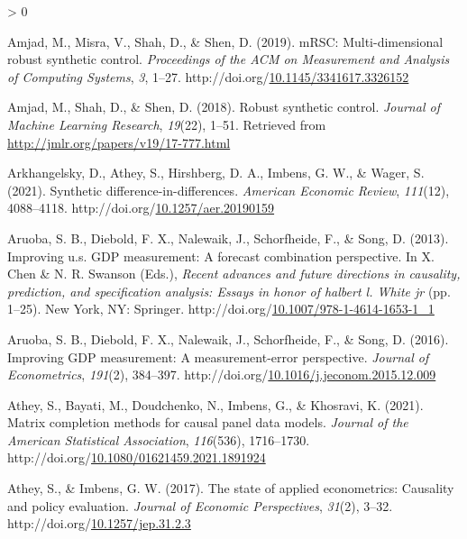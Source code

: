 \documentclass[12pt,nobind, a4paper]{reedthesis}
\newlength{\cslhangindent}
\newenvironment{CSLReferences}[2] %
{%
	\setlength{\parindent}{0pt}
	\ifodd #1 \everypar{\setlength{\hangindent}{\cslhangindent}}\ignorespaces\fi
	\ifnum #2 > 0
	\setlength{\parskip}{#2\baselineskip}
	\fi
}%
{}
\begin{document}
\begin{CSLReferences}{1}{0}
 \leavevmode\hypertarget{ref-amjad_mrsc_2019}{}%
 Amjad, M., Misra, V., Shah, D., \& Shen, D. (2019). {mRSC}: Multi-dimensional robust synthetic control. \emph{Proceedings of the {ACM} on Measurement and Analysis of Computing Systems}, \emph{3}, 1--27. http://doi.org/\href{https://doi.org/10.1145/3341617.3326152}{10.1145/3341617.3326152}

 \leavevmode\hypertarget{ref-amjad_robust_2018}{}%
 Amjad, M., Shah, D., \& Shen, D. (2018). Robust synthetic control. \emph{Journal of Machine Learning Research}, \emph{19}(22), 1--51. Retrieved from \url{http://jmlr.org/papers/v19/17-777.html}

 \leavevmode\hypertarget{ref-arkhangelsky_synthetic_2021}{}%
 Arkhangelsky, D., Athey, S., Hirshberg, D. A., Imbens, G. W., \& Wager, S. (2021). Synthetic difference-in-differences. \emph{American Economic Review}, \emph{111}(12), 4088--4118. http://doi.org/\href{https://doi.org/10.1257/aer.20190159}{10.1257/aer.20190159}

 \leavevmode\hypertarget{ref-aruoba_improving_2013}{}%
 Aruoba, S. B., Diebold, F. X., Nalewaik, J., Schorfheide, F., \& Song, D. (2013). Improving u.s. {GDP} measurement: A forecast combination perspective. In X. Chen \& N. R. Swanson (Eds.), \emph{Recent advances and future directions in causality, prediction, and specification analysis: Essays in honor of halbert l. White jr} (pp. 1--25). New York, {NY}: Springer. http://doi.org/\href{https://doi.org/10.1007/978-1-4614-1653-1_1}{10.1007/978-1-4614-1653-1\_1}

 \leavevmode\hypertarget{ref-aruoba_improving_2016}{}%
 Aruoba, S. B., Diebold, F. X., Nalewaik, J., Schorfheide, F., \& Song, D. (2016). Improving {GDP} measurement: A measurement-error perspective. \emph{Journal of Econometrics}, \emph{191}(2), 384--397. http://doi.org/\href{https://doi.org/10.1016/j.jeconom.2015.12.009}{10.1016/j.jeconom.2015.12.009}

 \leavevmode\hypertarget{ref-athey_matrix_2021}{}%
 Athey, S., Bayati, M., Doudchenko, N., Imbens, G., \& Khosravi, K. (2021). Matrix completion methods for causal panel data models. \emph{Journal of the American Statistical Association}, \emph{116}(536), 1716--1730. http://doi.org/\href{https://doi.org/10.1080/01621459.2021.1891924}{10.1080/01621459.2021.1891924}

 \leavevmode\hypertarget{ref-athey_state_2017}{}%
 Athey, S., \& Imbens, G. W. (2017). The state of applied econometrics: Causality and policy evaluation. \emph{Journal of Economic Perspectives}, \emph{31}(2), 3--32. http://doi.org/\href{https://doi.org/10.1257/jep.31.2.3}{10.1257/jep.31.2.3}


\end{CSLReferences}
\end{document}
